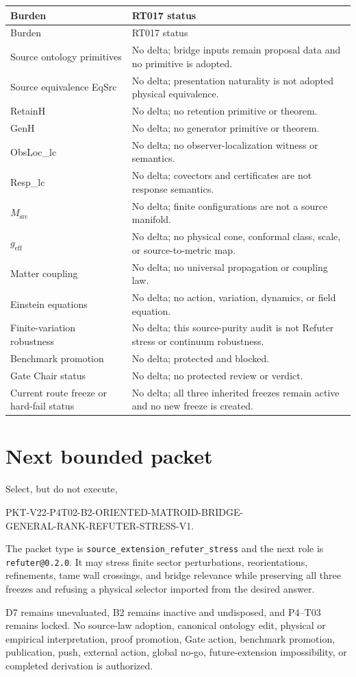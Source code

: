 \documentclass[11pt]{article}
\begin{document}
\begin{longtable}{p{}p{}}
\toprule
Burden & RT017 status \\
\midrule
\endfirsthead
\toprule
Burden & RT017 status \\
\midrule
\endhead
Source ontology primitives & No delta; bridge inputs remain proposal data and no primitive is adopted. \\
Source equivalence EqSrc & No delta; presentation naturality is not adopted physical equivalence. \\
RetainH & No delta; no retention primitive or theorem. \\
GenH & No delta; no generator primitive or theorem. \\
ObsLoc\_lc & No delta; no observer-localization witness or semantics. \\
Resp\_lc & No delta; covectors and certificates are not response semantics. \\
$M_{\mathrm{src}}$ & No delta; finite configurations are not a source manifold. \\
$g_{\mathrm{eff}}$ & No delta; no physical cone, conformal class, scale, or source-to-metric map. \\
Matter coupling & No delta; no universal propagation or coupling law. \\
Einstein equations & No delta; no action, variation, dynamics, or field equation. \\
Finite-variation robustness & No delta; this source-purity audit is not Refuter stress or continuum robustness. \\
Benchmark promotion & No delta; protected and blocked. \\
Gate Chair status & No delta; no protected review or verdict. \\
Current route freeze or hard-fail status & No delta; all three inherited freezes remain active and no new freeze is created. \\
\bottomrule
\end{longtable}

\section{Next bounded packet}

Select, but do not execute,
\begin{flushleft}
\small\ttfamily
PKT-V22-P4T02-B2-ORIENTED-MATROID-BRIDGE-\\
GENERAL-RANK-REFUTER-STRESS-V1.
\end{flushleft}
The packet type is \texttt{source\_extension\_refuter\_stress} and the next
role is \texttt{refuter@0.2.0}.  It may stress finite sector perturbations,
reorientations, refinements, tame wall crossings, and bridge relevance while
preserving all three freezes and refusing a physical selector imported from
the desired answer.

D7 remains unevaluated, B2 remains inactive and undisposed, and P4--T03
remains locked.  No source-law adoption, canonical ontology edit, physical or
empirical interpretation, proof promotion, Gate action, benchmark promotion,
publication, push, external action, global no-go, future-extension
impossibility, or completed derivation is authorized.
\end{document}
